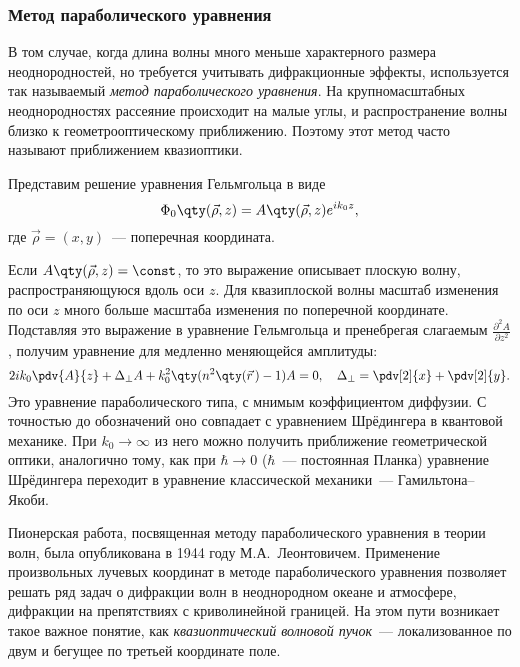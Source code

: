 \subsubsection{Метод параболического уравнения}

В том случае, когда длина волны много меньше характерного размера неоднородностей, но требуется учитывать дифракционные эффекты, используется так называемый \textit{метод параболического уравнения}. На крупномасштабных неоднородностях рассеяние происходит на малые углы, и распространение волны близко к геометрооптическому приближению. Поэтому этот метод часто называют приближением квазиоптики.

Представим решение уравнения Гельмгольца в виде
\begin{equation}
\Phi_0 \qty({\vec{\rho}} ,z) =A \qty(\vec{\rho} ,z) e^{i k_0 z},
\end{equation}
где $\vec{\rho} =(x,y)$~--- поперечная координата.

Если $A \qty(\vec{\rho} ,z) =\const$, то это выражение описывает плоскую волну, распространяющуюся вдоль оси $z$. Для квазиплоской волны масштаб изменения по оси $z$ много больше масштаба изменения по поперечной координате. Подставляя это выражение в уравнение Гельмгольца и пренебрегая слагаемым $\frac{\partial^2 A}{\partial z^2}$, получим уравнение для медленно меняющейся амплитуды:
\begin{equation}
2i k_0 \pdv{A}{z} + \Delta_\bot A+ k_0^2 \qty(n^2 \qty(\vec{r}\,) -1)A =0, \quad \Delta_\bot = \pdv[2]{x} + \pdv[2]{y}.
\end{equation}
Это уравнение параболического типа, с мнимым коэффициентом диффузии. С точностью до обозначений оно совпадает с уравнением Шрёдингера в квантовой механике. При $k_0 \to \infty$ из него можно получить приближение геометрической оптики, аналогично тому, как при $\hbar\to 0$ ($\hbar$~--- постоянная Планка) уравнение Шрёдингера переходит в уравнение классической механики~--- Гамильтона--Якоби.

Пионерская работа, посвященная методу параболического уравнения в теории волн, была опубликована в 1944 году М.А.~Леонтовичем. Применение произвольных лучевых координат в методе параболического уравнения позволяет решать ряд задач о дифракции волн в неоднородном океане и атмосфере, дифракции на препятствиях с криволинейной границей. На этом пути возникает такое важное понятие, как \textit{квазиоптический волновой пучок}~--- локализованное по двум и бегущее по третьей координате поле.


\newpage
{}
